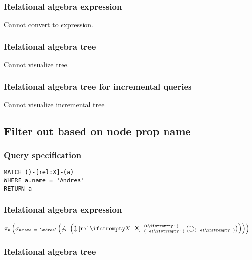 \subsubsection*{Relational algebra expression}

Cannot convert to expression.

\subsubsection*{Relational algebra tree}

Cannot visualize tree.

\subsubsection*{Relational algebra tree for incremental queries}

Cannot visualize incremental tree.

\subsection{Filter out based on node prop name}

\subsubsection*{Query specification}

\begin{lstlisting}
MATCH ()-[rel:X]-(a)
WHERE a.name = 'Andres'
RETURN a
\end{lstlisting}

\subsubsection*{Relational algebra expression}

$\projection{\var{a}} \left(\selection{\mathtt{a.name~=~'Andres'}} \left(\alldifferent{} \left(\expandboth{rel}{X}{\_e1}{a}{} \left(\getvertices{\_e1}{}\right)\right)\right)\right)$

\subsubsection*{Relational algebra tree}


